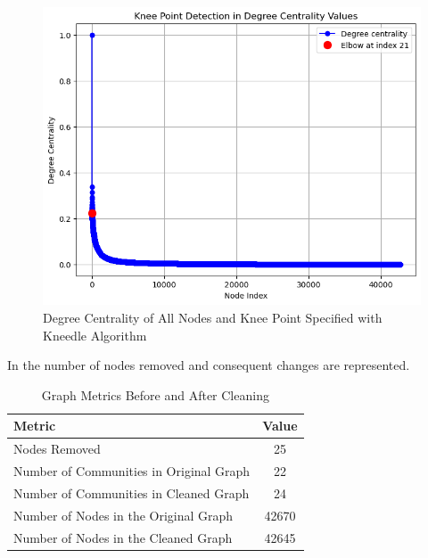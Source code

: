 \begin{figure}[h!]
	\begin{center}
		\includegraphics[width=\columnwidth, keepaspectratio=true]{images/degree_centralitites_and_knee_point.png}
		\caption{Degree Centrality of All Nodes and Knee Point Specified with Kneedle Algorithm}
		\label{fig:degree_centralitites_and_knee_point}
	\end{center}
\end{figure}

In  the number of nodes removed and consequent changes are represented.

\begin{table}[h]
	\centering
	\begin{tabular}{l c}
	\hline
	\textbf{Metric} & \textbf{Value} \\
	\hline
	Nodes Removed & 25 \\
	Number of Communities in Original Graph & 22 \\
	Number of Communities in Cleaned Graph & 24 \\
	Number of Nodes in the Original Graph & 42670 \\
	Number of Nodes in the Cleaned Graph & 42645 \\
	\hline
	\end{tabular}
	\caption{Graph Metrics Before and After Cleaning}
	\label{tab:graph_metrics}
	\end{table}


